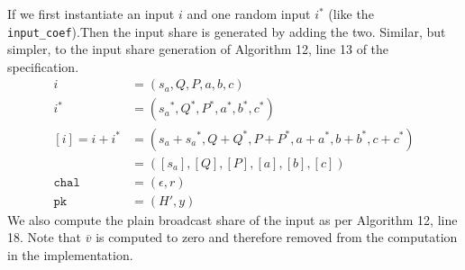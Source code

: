 \documentclass[twoside,11pt]{report}
\theoremstyle{definition}
\theoremstyle{plain}
\begin{document}
If we first instantiate an input $i$ and one random input $i^*$ (like the \texttt{input\_coef}).Then the input share is generated by adding the two. Similar, but simpler, to the input share generation of Algorithm 12, line 13 of the specification.
\begin{align*}
  i             & = (s_a, Q, P, a,b,c)                                             \\
  i^*           & = ({s_a}^*, Q^*, P^*, a^*,b^*,c^*)                               \\
  [i] = i + i^* & = ({s_a} + {s_a}^*, Q + Q^*, P + P^*, a + a^*, b + b^*, c + c^*) \\
                & = ([s_a], [Q], [P], [a], [b], [c])                               \\
  \texttt{chal} & = (\epsilon, r)                                                  \\
  \texttt{pk}   & = (H', y)
\end{align*}
We also compute the plain broadcast share of the input as per Algorithm 12, line 18. Note that $\overline{v}$ is computed to zero and therefore removed from the computation in the implementation.
\end{document}

